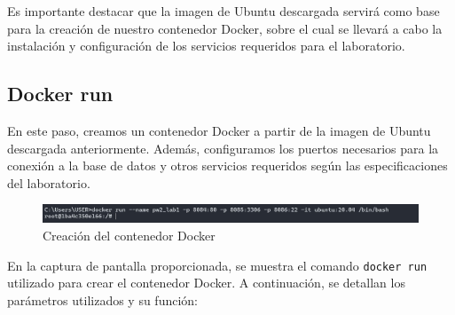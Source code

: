 \documentclass{article}
\begin{document}
Es importante destacar que la imagen de Ubuntu descargada servirá como base para la creación de nuestro contenedor Docker, sobre el cual se llevará a cabo la instalación y configuración de los servicios requeridos para el laboratorio.


\subsection{Docker run}

En este paso, creamos un contenedor Docker a partir de la imagen de Ubuntu descargada anteriormente. Además, configuramos los puertos necesarios para la conexión a la base de datos y otros servicios requeridos según las especificaciones del laboratorio.

\begin{figure}[h]
    \centering
    \includegraphics[width=1\textwidth]{latex/img/docker_run.png}
    \caption{Creación del contenedor Docker}
    \label{fig:docker_run}
\end{figure}

En la captura de pantalla proporcionada, se muestra el comando \texttt{docker run} utilizado para crear el contenedor Docker. A continuación, se detallan los parámetros utilizados y su función:
\end{document}
